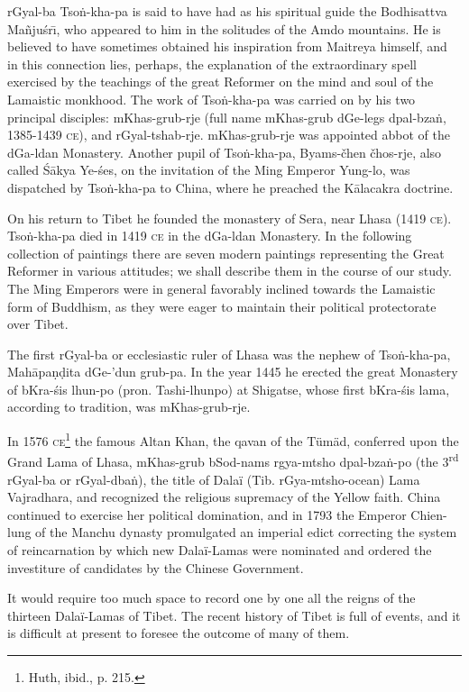 \documentclass[a4paper, 12pt, oneside]{article}
\begin{document}
rGyal-ba Tso\.{n}-kha-pa is said to have had as his spiritual guide the Bodhisattva Ma\~{n}ju\'{s}r\={\i}, who appeared to him in the solitudes of the Amdo mountains. He is believed to have sometimes obtained his inspiration from Maitreya himself, and in this connection lies, perhaps, the explanation of the extraordinary spell exercised by the teachings of the great Reformer on the mind and soul of the Lamaistic monkhood. The work of Tso\.{n}-kha-pa was carried on by his two principal disciples: mKhas-grub-rje (full name mKhas-grub dGe-legs dpal-bza\.{n}, 1385-1439 \textsc{ce}), and rGyal-tshab-rje. mKhas-grub-rje was appointed abbot of the dGa-ldan Monastery. Another pupil of Tso\.{n}-kha-pa, Byams-čhen čhos-rje, also called \'{S}\={a}kya Ye-\'{s}es, on the invitation of the Ming Emperor Yung-lo, was dispatched by Tso\.{n}-kha-pa to China, where he preached the K\={a}lacakra doctrine.

On his return to Tibet he founded the monastery of Sera, near Lhasa (1419 \textsc{ce}). Tso\.{n}-kha-pa died in 1419 \textsc{ce} in the dGa-ldan Monastery. In the following collection of paintings there are seven modern paintings representing the Great Reformer in various attitudes; we shall describe them in the course of our study. The Ming Emperors were in general favorably inclined towards the Lamaistic form of Buddhism, as they were eager to maintain their political protectorate over Tibet.

The first rGyal-ba or ecclesiastic ruler of Lhasa was the nephew of Tso\.{n}-kha-pa, Mah\={a}pa\d{n}\d{d}ita dGe-'dun grub-pa. In the year 1445 he erected the great Monastery of bKra-\'{s}is lhun-po (pron. Tashi-lhunpo) at Shigatse, whose first bKra-\'{s}is lama, according to tradition, was mKhas-grub-rje.

In 1576 \textsc{ce}\footnote{Huth, ibid., p. 215.} the famous Altan Khan, the qavan of the Tümäd, conferred upon the Grand Lama of Lhasa, mKhas-grub bSod-nams rgya-mtsho dpal-bza\.{n}-po (the 3\textsuperscript{rd} rGyal-ba or rGyal-dba\.{n}), the title of Dalaï (Tib. rGya-mtsho-ocean) Lama Vajradhara, and recognized the religious supremacy of the Yellow faith. China continued to exercise her political domination, and in 1793 the Emperor Chien-lung of the Manchu dynasty promulgated an imperial edict correcting the system of reincarnation by which new Dalaï-Lamas were nominated and ordered the investiture of candidates by the Chinese Government.

It would require too much space to record one by one all the reigns of the thirteen Dalaï-Lamas of Tibet. The recent history of Tibet is full of events, and it is difficult at present to foresee the outcome of many of them.
\end{document}
